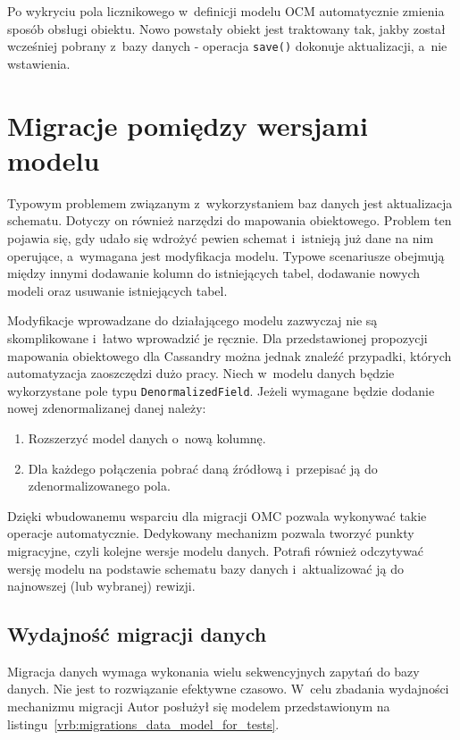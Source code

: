 Po wykryciu pola licznikowego w~definicji modelu OCM automatycznie zmienia sposób obsługi obiektu. Nowo powstały obiekt jest traktowany tak, jakby został wcześniej pobrany z~bazy danych - operacja \verb+save()+ dokonuje aktualizacji, a~nie wstawienia. 

\section{Migracje pomiędzy wersjami modelu}

Typowym problemem związanym z~wykorzystaniem baz danych jest aktualizacja schematu. Dotyczy on również narzędzi do mapowania obiektowego. Problem ten pojawia się, gdy udało się wdrożyć pewien schemat i~istnieją już dane na nim operujące, a~wymagana jest modyfikacja modelu. Typowe scenariusze obejmują między innymi dodawanie kolumn do istniejących tabel, dodawanie nowych modeli oraz usuwanie istniejących tabel. 

Modyfikacje wprowadzane do działającego modelu zazwyczaj nie są skomplikowane i~łatwo wprowadzić je ręcznie. Dla przedstawionej propozycji mapowania obiektowego dla Cassandry można jednak znaleźć przypadki, których automatyzacja zaoszczędzi dużo pracy. Niech w~modelu danych będzie wykorzystane pole typu \verb+DenormalizedField+. Jeżeli wymagane będzie dodanie nowej zdenormalizanej danej należy:

\begin{enumerate}
	\item Rozszerzyć model danych o~nową kolumnę.
	\item Dla każdego połączenia pobrać daną źródłową i~przepisać ją do zdenormalizowanego pola.
\end{enumerate}

Dzięki wbudowanemu wsparciu dla migracji OMC pozwala wykonywać takie operacje automatycznie. Dedykowany mechanizm pozwala tworzyć punkty migracyjne, czyli kolejne wersje modelu danych. Potrafi również odczytywać wersję modelu na podstawie schematu bazy danych i~aktualizować ją do najnowszej (lub wybranej) rewizji.

\subsection{Wydajność migracji danych}
\label{sec:ocm_migrations_performance}

Migracja danych wymaga wykonania wielu sekwencyjnych zapytań do bazy danych. Nie jest to rozwiązanie efektywne czasowo. W~celu zbadania wydajności mechanizmu migracji Autor posłużył się modelem przedstawionym na listingu~\ref{vrb:migrations_data_model_for_tests}.

